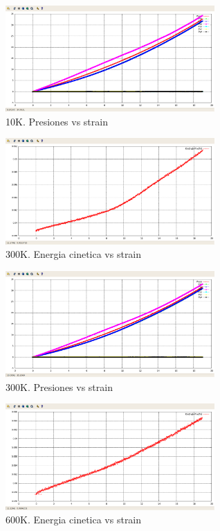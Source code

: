 \documentclass[10pt, oneside]{article} %
\begin{document}
\begin{figure}[H]
\centering
\includegraphics[width=8cm]{Figures/10-Tensiones-deformacion.png}
\caption{10K. Presiones vs strain}
\end{figure}

\begin{figure}[H]
\centering
\includegraphics[width=8cm]{Figures/300-KinEng-deformacion.png}
\caption{300K. Energia cinetica vs strain}
\end{figure}

\begin{figure}[H]
\centering
\includegraphics[width=8cm]{Figures/300-Tensiones-deformacion.png}
\caption{300K. Presiones vs strain}
\end{figure}

\begin{figure}[H]
\centering
\includegraphics[width=8cm]{Figures/600-KinEng-deformacion.png}
\caption{600K. Energia cinetica vs strain}
\end{figure}
\end{document}

